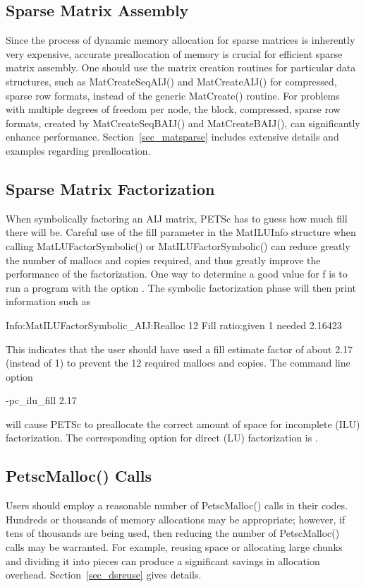{{\subsection{Sparse Matrix Assembly}

Since the process of dynamic memory allocation for sparse matrices is
inherently very expensive, accurate preallocation of memory is crucial
for efficient sparse matrix assembly.  One should use the matrix creation
routines for particular data structures, such as MatCreateSeqAIJ() and MatCreateAIJ() for compressed, sparse
row formats, instead of the generic MatCreate() routine.  For
problems with multiple degrees of freedom per node, the block,
compressed, sparse row formats, created by MatCreateSeqBAIJ()
and MatCreateBAIJ(), can significantly enhance performance.
Section~\ref{sec_matsparse} includes extensive details and
examples regarding preallocation.

\subsection{Sparse Matrix Factorization}
\label{sec_symbolfactor}

When symbolically factoring an AIJ matrix, PETSc has to guess
how much fill there will be.  Careful use of the fill parameter in the
MatILUInfo structure
when calling MatLUFactorSymbolic() or MatILUFactorSymbolic()
can reduce greatly the number of mallocs and copies required, and thus
greatly improve the performance of the factorization.  One way to
determine a good value for f is to run a program with the option .
The symbolic factorization phase will then print information such as
\begin{tabbing}
   Info:MatILUFactorSymbolic\_AIJ:Realloc 12 Fill ratio:given 1 needed 2.16423
\end{tabbing}
This indicates that the user should have used a fill estimate factor of
about 2.17 (instead of 1) to prevent the 12 required mallocs and copies.
The command line option   
\begin{tabbing}
    -pc\_ilu\_fill 2.17
\end{tabbing}
will cause PETSc to preallocate the correct amount of space for incomplete
(ILU) factorization.  The corresponding option for direct (LU) factorization
is  .

\subsection{PetscMalloc() Calls}
Users should employ a reasonable number of PetscMalloc() calls in their codes.
Hundreds or thousands of memory allocations may be appropriate; however, if tens of
thousands are being used, then reducing the number of PetscMalloc() calls
may be warranted.  For example, reusing space or allocating large chunks
and dividing it into pieces can produce a significant savings in
allocation overhead.  Section~\ref{sec_dsreuse} gives details.

}}
